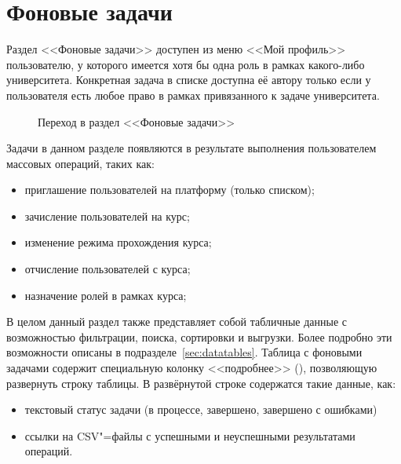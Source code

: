 \graphicspath{ {images/mat/} }
\section{Фоновые задачи} \label{sec:mass_async_task}

Раздел <<Фоновые задачи>> доступен из меню <<Мой профиль>> пользователю, у которого имеется хотя бы одна роль в рамках какого-либо университета. Конкретная задача в списке доступна её автору только если у пользователя есть любое право в рамках привязанного к задаче университета.

\begin{figure}[H]
	\caption{Переход в раздел <<Фоновые задачи>>}
	\label{img:employee:my_dumps}
\end{figure}

Задачи в данном разделе появляются в результате выполнения пользователем массовых операций, таких как:
\begin{itemize}
	\item приглашение пользователей на платформу (только списком);
	\item зачисление пользователей на курс; 
	\item изменение режима прохождения курса;
	\item отчисление пользователей с курса;
	\item назначение ролей в рамках курса;
\end{itemize}

В целом данный раздел также представляет собой табличные данные с возможностью фильтрации, поиска, сортировки и выгрузки.
Более подробно эти возможности описаны в подразделе~\ref{sec:datatables}. Таблица с фоновыми задачами содержит специальную колонку <<подробнее>> (), позволяющую развернуть строку таблицы. В развёрнутой строке содержатся такие данные, как:
\begin{itemize}
	\item текстовый статус задачи (в процессе, завершено, завершено с ошибками)
	\item ссылки на CSV"=файлы с успешными и неуспешными результатами операций.
\end{itemize}

